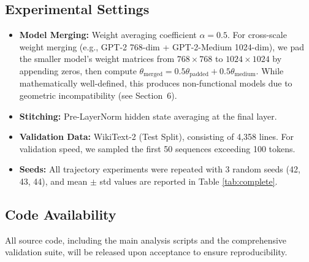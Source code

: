 \documentclass[10pt]{article} %
\theoremstyle{plain}
\theoremstyle{definition}
\theoremstyle{remark}
\begin{document}
\subsection{Experimental Settings}
\begin{itemize}
    \item \textbf{Model Merging:} Weight averaging coefficient $\alpha = 0.5$. For cross-scale weight merging (e.g., GPT-2 768-dim + GPT-2-Medium 1024-dim), we pad the smaller model's weight matrices from $768 \times 768$ to $1024 \times 1024$ by appending zeros, then compute $\theta_{\text{merged}} = 0.5\theta_{\text{padded}} + 0.5\theta_{\text{medium}}$. While mathematically well-defined, this produces non-functional models due to geometric incompatibility (see Section~6).
    \item \textbf{Stitching:} Pre-LayerNorm hidden state averaging at the final layer.
    \item \textbf{Validation Data:} WikiText-2 (Test Split), consisting of 4,358 lines. For validation speed, we sampled the first 50 sequences exceeding 100 tokens.
    \item \textbf{Seeds:} All trajectory experiments were repeated with 3 random seeds (42, 43, 44), and mean $\pm$ std values are reported in Table \ref{tab:complete}.
\end{itemize}

\subsection{Code Availability}
All source code, including the main analysis scripts and the comprehensive validation suite, will be released upon acceptance to ensure reproducibility.
\end{document}
